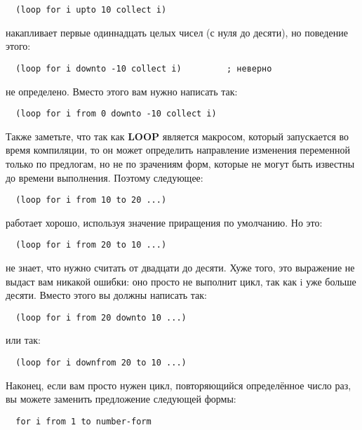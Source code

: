 \begin{lstlisting}
  (loop for i upto 10 collect i)
\end{lstlisting}

\noindent{}накапливает первые одиннадцать целых чисел (с нуля до десяти), но поведение этого:

\begin{lstlisting}
  (loop for i downto -10 collect i)         ; неверно
\end{lstlisting}

\noindent{}не определено. Вместо этого вам нужно написать так:

\begin{lstlisting}
  (loop for i from 0 downto -10 collect i)
\end{lstlisting}

Также заметьте, что так как \textbf{LOOP} является макросом, который запускается во время
компиляции, то он может определить направление изменения переменной только по предлогам,
но не по зрачениям форм, которые не могут быть известны до времени выполнения. Поэтому
следующее:

\begin{lstlisting}
  (loop for i from 10 to 20 ...) 
\end{lstlisting}

\noindent{}работает хорошо, используя значение приращения по умолчанию. Но это:

\begin{lstlisting}
  (loop for i from 20 to 10 ...)
\end{lstlisting}

\noindent{}не знает, что нужно считать от двадцати до десяти. Хуже того, это выражение не выдаст вам
никакой ошибки: оно просто не выполнит цикл, так как i уже больше десяти. Вместо этого вы
должны написать так:

\begin{lstlisting}
  (loop for i from 20 downto 10 ...)
\end{lstlisting}

\noindent{}или так:

\begin{lstlisting}
  (loop for i downfrom 20 to 10 ...)
\end{lstlisting}

Наконец, если вам просто нужен цикл, повторяющийся определённое число раз, вы можете
заменить предложение следующей формы:

\begin{lstlisting}
  for i from 1 to number-form
\end{lstlisting}

